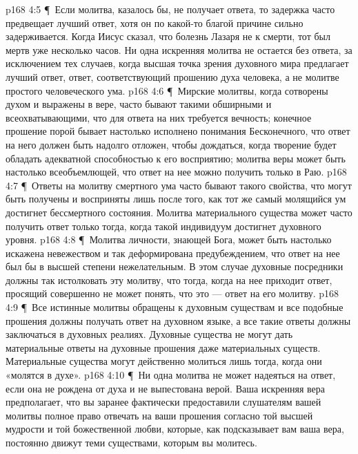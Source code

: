 \vs p168 4:5 \P\ \bibnobreakspace Если молитва, казалось бы, не получает ответа, то задержка часто предвещает лучший ответ, хотя он по какой\hyp{}то благой причине сильно задерживается. Когда Иисус сказал, что болезнь Лазаря не к смерти, тот был мертв уже несколько часов. Ни одна искренняя молитва не остается без ответа, за исключением тех случаев, когда высшая точка зрения духовного мира предлагает лучший ответ, ответ, соответствующий прошению духа человека, а не молитве простого человеческого ума.
\vs p168 4:6 \P\ \bibnobreakspace Мирские молитвы, когда сотворены духом и выражены в вере, часто бывают такими обширными и всеохватывающими, что для ответа на них требуется вечность; конечное прошение порой бывает настолько исполнено понимания Бесконечного, что ответ на него должен быть надолго отложен, чтобы дождаться, когда творение будет обладать адекватной способностью к его восприятию; молитва веры может быть настолько всеобъемлющей, что ответ на нее можно получить только в Раю.
\vs p168 4:7 \P\ \bibnobreakspace Ответы на молитву смертного ума часто бывают такого свойства, что могут быть получены и восприняты лишь после того, как тот же самый молящийся ум достигнет бессмертного состояния. Молитва материального существа может часто получить ответ только тогда, когда такой индивидуум достигнет духовного уровня.
\vs p168 4:8 \P\ \bibnobreakspace Молитва личности, знающей Бога, может быть настолько искажена невежеством и так деформирована предубеждением, что ответ на нее был бы в высшей степени нежелательным. В этом случае духовные посредники должны так истолковать эту молитву, что тогда, когда на нее приходит ответ, просящий совершенно не может понять, что это --- ответ на его молитву.
\vs p168 4:9 \P\ \bibnobreakspace Все истинные молитвы обращены к духовным существам и все подобные прошения должны получать ответ на духовном языке, а все такие ответы должны заключаться в духовных реалиях. Духовные существа не могут дать материальные ответы на духовные прошения даже материальных существ. Материальные существа могут действенно молиться лишь тогда, когда они «молятся в духе».
\vs p168 4:10 \P\ \bibnobreakspace Ни одна молитва не может надеяться на ответ, если она не рождена от духа и не выпестована верой. Ваша искренняя вера предполагает, что вы заранее фактически предоставили слушателям вашей молитвы полное право отвечать на ваши прошения согласно той высшей мудрости и той божественной любви, которые, как подсказывает вам ваша вера, постоянно движут теми существами, которым вы молитесь.
